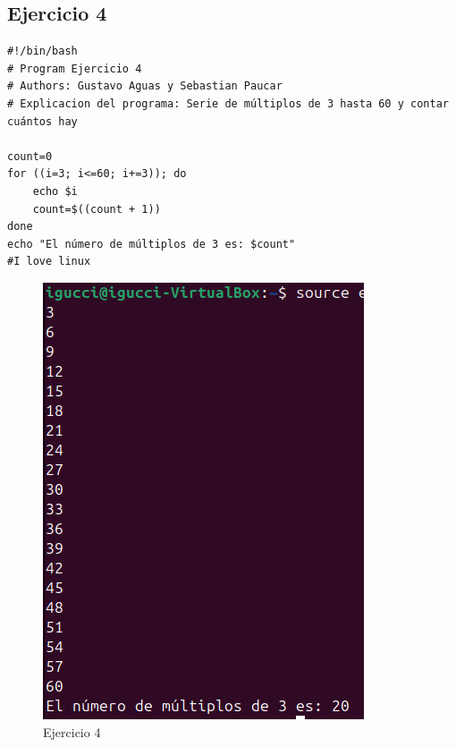 \documentclass[11pt,twoside]{book}
\begin{document}
\subsection{Ejercicio 4}
\begin{lstlisting}
#!/bin/bash
# Program Ejercicio 4
# Authors: Gustavo Aguas y Sebastian Paucar
# Explicacion del programa: Serie de múltiplos de 3 hasta 60 y contar cuántos hay

count=0
for ((i=3; i<=60; i+=3)); do
    echo $i
    count=$((count + 1))
done
echo "El número de múltiplos de 3 es: $count"
#I love linux
\end{lstlisting}
\begin{figure}[h]
    \centering
    \includegraphics[width=0.5\linewidth]{series/ej4.png}
    \caption{Ejercicio 4}
\end{figure}
\newpage
\end{document}
